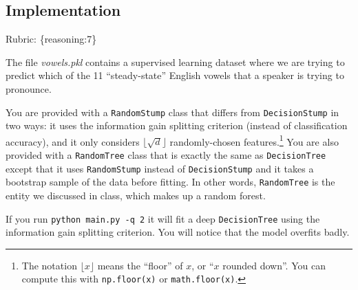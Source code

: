 \documentclass{article}
\def\gre#1{{\color{gre}#1}}
\def\rubric#1{\gre{Rubric: \{#1\}}}{}
\begin{document}
\subsection{Implementation}
\rubric{reasoning:7}

The file \emph{vowels.pkl} contains a supervised learning dataset where we are trying to predict which of the 11 ``steady-state'' English vowels that a speaker is trying to pronounce.

You are provided with a \texttt{RandomStump} class that differs from
\texttt{DecisionStump} in two ways: it uses the information gain splitting criterion
(instead of classification accuracy), and
it only considers $\lfloor \sqrt{d} \rfloor$ randomly-chosen features.\footnote{The notation $\lfloor x\rfloor$ means the ``floor'' of $x$, or ``$x$ rounded down''. You can compute this with \texttt{np.floor(x)} or \texttt{math.floor(x)}.}
You are also provided with a \texttt{RandomTree} class that is exactly the same as
\texttt{DecisionTree} except that it uses \texttt{RandomStump} instead of
\texttt{DecisionStump} and it takes a bootstrap sample of the data before fitting.
In other words, \texttt{RandomTree} is the entity we discussed in class, which
makes up a random forest.

If you run \texttt{python main.py -q 2} it will fit a deep \texttt{DecisionTree}
using the information gain splitting criterion. You will notice that the model overfits badly.
\end{document}
